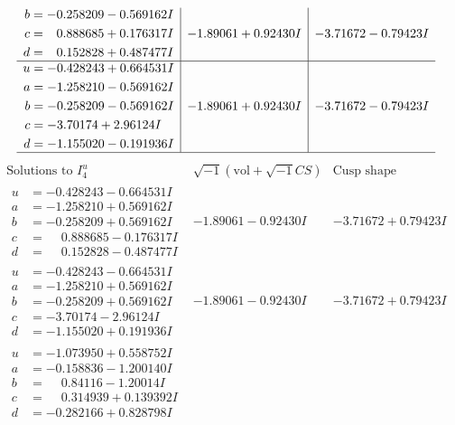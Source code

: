 \documentclass[1p]{elsarticle_modified}
\theoremstyle{definition}
\newcommand{\I}{\sqrt{-1}}
\begin{document}
$$\begin{array}{c|c|c}
\begin{aligned}
b &= -0.258209 - 0.569162 I \\
c &= \phantom{-}0.888685 + 0.176317 I \\
d &= \phantom{-}0.152828 + 0.487477 I\end{aligned}
 & -1.89061 + 0.92430 I & -3.71672 - 0.79423 I \\ \hline\begin{aligned}
u &= -0.428243 + 0.664531 I \\
a &= -1.258210 - 0.569162 I \\
b &= -0.258209 - 0.569162 I \\
c &= -3.70174 + 2.96124 I \\
d &= -1.155020 - 0.191936 I\end{aligned}
 & -1.89061 + 0.92430 I & -3.71672 - 0.79423 I\\
 \hline 
 \end{array}$$\newpage$$\begin{array}{c|c|c}  
\text{Solutions to }I^u_{4}& \I (\text{vol} + \sqrt{-1}CS) & \text{Cusp shape}\\
 \hline 
\begin{aligned}
u &= -0.428243 - 0.664531 I \\
a &= -1.258210 + 0.569162 I \\
b &= -0.258209 + 0.569162 I \\
c &= \phantom{-}0.888685 - 0.176317 I \\
d &= \phantom{-}0.152828 - 0.487477 I\end{aligned}
 & -1.89061 - 0.92430 I & -3.71672 + 0.79423 I \\ \hline\begin{aligned}
u &= -0.428243 - 0.664531 I \\
a &= -1.258210 + 0.569162 I \\
b &= -0.258209 + 0.569162 I \\
c &= -3.70174 - 2.96124 I \\
d &= -1.155020 + 0.191936 I\end{aligned}
 & -1.89061 - 0.92430 I & -3.71672 + 0.79423 I \\ \hline\begin{aligned}
u &= -1.073950 + 0.558752 I \\
a &= -0.158836 - 1.200140 I \\
b &= \phantom{-}0.84116 - 1.20014 I \\
c &= \phantom{-}0.314939 + 0.139392 I \\
d &= -0.282166 + 0.828798 I\end{aligned}

\end{array}$$
\end{document}
